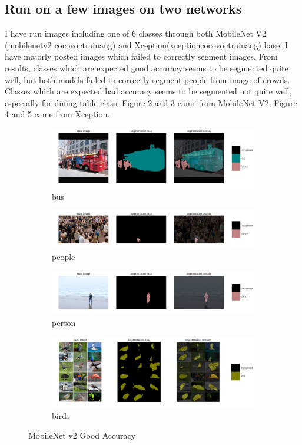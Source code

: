 \documentclass{article}
\begin{document}
\subsection{Run on a few images on two networks}
I have run images including one of 6 classes through both MobileNet V2 (mobilenetv2 \textunderscore coco\textunderscore voctrainaug) and Xception(xception\textunderscore coco\textunderscore voctrainaug) base. I have majorly posted images which failed to correctly segment images. From results, classes which are expected good accuracy seems to be segmented quite well, but both models failed to correctly segment people from image of crowds. Classes which are expected bad accuracy seems to be segmented not quite well, especially for dining table class. Figure 2 and 3 came from MobileNet V2, Figure 4 and 5 came from Xception.
\begin{figure}[h!]
\begin{subfigure}[b]{1.0\textwidth}
\includegraphics[width=\linewidth]{bus1.png}
\caption{bus}
\end{subfigure}
\begin{subfigure}[b]{1.0\textwidth}
\includegraphics[width=\linewidth]{people.png}
\caption{people}
\end{subfigure}
\begin{subfigure}[b]{1.0\textwidth}
\includegraphics[width=\linewidth]{person.png}
\caption{person}
\end{subfigure}
\begin{subfigure}[b]{1.0\textwidth}
\includegraphics[width=\linewidth]{birds.png}
\caption{birds}
\end{subfigure}
\caption{MobileNet v2 Good Accuracy}
\end{figure}
\end{document}
